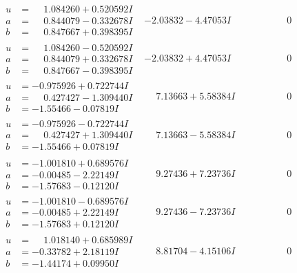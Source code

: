 \documentclass[1p]{elsarticle_modified}
\theoremstyle{definition}
\begin{document}
$$\begin{array}{c|c|c}
\begin{aligned}
u &= \phantom{-}1.084260 + 0.520592 I \\
a &= \phantom{-}0.844079 - 0.332678 I \\
b &= \phantom{-}0.847667 + 0.398395 I\end{aligned}
 & -2.03832 - 4.47053 I & \phantom{-0.000000 } 0 \\ \hline\begin{aligned}
u &= \phantom{-}1.084260 - 0.520592 I \\
a &= \phantom{-}0.844079 + 0.332678 I \\
b &= \phantom{-}0.847667 - 0.398395 I\end{aligned}
 & -2.03832 + 4.47053 I & \phantom{-0.000000 } 0 \\ \hline\begin{aligned}
u &= -0.975926 + 0.722744 I \\
a &= \phantom{-}0.427427 - 1.309440 I \\
b &= -1.55466 - 0.07819 I\end{aligned}
 & \phantom{-}7.13663 + 5.58384 I & \phantom{-0.000000 } 0 \\ \hline\begin{aligned}
u &= -0.975926 - 0.722744 I \\
a &= \phantom{-}0.427427 + 1.309440 I \\
b &= -1.55466 + 0.07819 I\end{aligned}
 & \phantom{-}7.13663 - 5.58384 I & \phantom{-0.000000 } 0 \\ \hline\begin{aligned}
u &= -1.001810 + 0.689576 I \\
a &= -0.00485 - 2.22149 I \\
b &= -1.57683 - 0.12120 I\end{aligned}
 & \phantom{-}9.27436 + 7.23736 I & \phantom{-0.000000 } 0 \\ \hline\begin{aligned}
u &= -1.001810 - 0.689576 I \\
a &= -0.00485 + 2.22149 I \\
b &= -1.57683 + 0.12120 I\end{aligned}
 & \phantom{-}9.27436 - 7.23736 I & \phantom{-0.000000 } 0 \\ \hline\begin{aligned}
u &= \phantom{-}1.018140 + 0.685989 I \\
a &= -0.33782 + 2.18119 I \\
b &= -1.44174 + 0.09950 I\end{aligned}
 & \phantom{-}8.81704 - 4.15106 I & \phantom{-0.000000 } 0 \\ \hline\begin{aligned}

\end{aligned}
\end{array}$$
\end{document}
